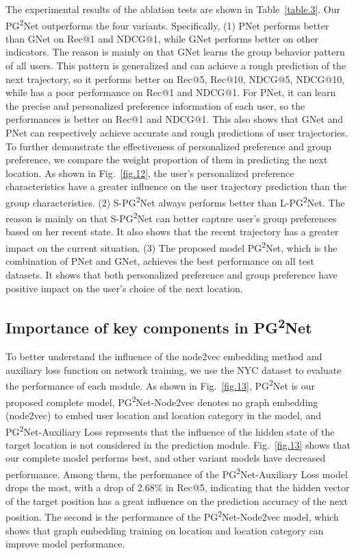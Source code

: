 \documentclass[10pt,journal,compsoc]{IEEEtran}
\begin{document}
The experimental results of the ablation tests are shown in Table~\ref{table.3}. Our PG\textsuperscript{2}Net outperforms the four variants. Specifically, (1) PNet performs better than GNet on Rec@1 and NDCG@1, while GNet performs better on other indicators. The reason is mainly on that GNet learns the group behavior pattern of all users. This pattern is generalized and can achieve a rough prediction of the next trajectory, so it performs better on Rec@5, Rec@10, NDCG@5, NDCG@10, while has a poor performance on Rec@1 and NDCG@1. For PNet, it can learn the precise and personalized preference information of each user, so the performances is better on Rec@1 and NDCG@1. This also shows that GNet and PNet can respectively achieve accurate and rough predictions of user trajectories. To further demonstrate the effectiveness of personalized preference and group preference, we compare the weight proportion of them in predicting the next location. As shown in Fig.~\ref{fig.12}, the user's personalized preference characteristics have a greater influence on the user trajectory prediction than the group characteristics. (2) S-PG\textsuperscript{2}Net always performs better than L-PG\textsuperscript{2}Net. The reason is mainly on that S-PG\textsuperscript{2}Net can better capture user’s group preferences based on her recent state. It also shows that the recent trajectory has a greater impact on the current situation.
(3) The proposed model PG\textsuperscript{2}Net, which is the combination of PNet and GNet, achieves the best performance on all test datasets. It shows that both personalized preference and group preference have positive impact on the user’s choice of the next location.



\subsection{Importance of key components in PG\textsuperscript{2}Net}

To better understand the influence of the node2vec embedding method and auxiliary loss function on network training, we use the NYC dataset to evaluate the performance of each module. As shown in Fig.~\ref{fig.13}, PG\textsuperscript{2}Net is our proposed complete model, PG\textsuperscript{2}Net-Node2vec denotes no graph embedding (node2vec) to embed user location and location category in the model, and  PG\textsuperscript{2}Net-Auxiliary Loss represents that the influence of the hidden state of the target location is not considered in the prediction module. Fig.~\ref{fig.13} shows that our complete model performs best, and other variant models have decreased performance. Among them, the performance of the PG\textsuperscript{2}Net-Auxiliary Loss model drops the most, with a drop of 2.68\% in Rec@5, indicating that the hidden vector of the target position has a great influence on the prediction accuracy of the next position. The second is the performance of the PG\textsuperscript{2}Net-Node2vec model, which shows that graph embedding training on location and location category can improve model performance.
\end{document}
